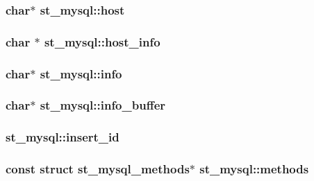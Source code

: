 \subsubsection[{host}]{\setlength{\rightskip}{0pt plus 5cm}char$\ast$ st\+\_\+mysql\+::host}\label{structst__mysql_aa63af77ef72c5732d53d735a67d20714}
\hypertarget{structst__mysql_afcd1b31ab175617ee15a9c26a6258457}{}
\subsubsection[{host\+\_\+info}]{\setlength{\rightskip}{0pt plus 5cm}char $\ast$ st\+\_\+mysql\+::host\+\_\+info}\label{structst__mysql_afcd1b31ab175617ee15a9c26a6258457}
\hypertarget{structst__mysql_acd1bb786ff93e6a27ec5028864945a5a}{}
\subsubsection[{info}]{\setlength{\rightskip}{0pt plus 5cm}char$\ast$ st\+\_\+mysql\+::info}\label{structst__mysql_acd1bb786ff93e6a27ec5028864945a5a}
\hypertarget{structst__mysql_a135e9fa0dea39f54be633acd845634a4}{}
\subsubsection[{info\+\_\+buffer}]{\setlength{\rightskip}{0pt plus 5cm}char$\ast$ st\+\_\+mysql\+::info\+\_\+buffer}\label{structst__mysql_a135e9fa0dea39f54be633acd845634a4}
\hypertarget{structst__mysql_a884df86e03be14c772cfe48511963fc1}{}
\subsubsection[{insert\+\_\+id}]{ st\+\_\+mysql\+::insert\+\_\+id}\label{structst__mysql_a884df86e03be14c772cfe48511963fc1}
\hypertarget{structst__mysql_a04129bc0cbeda076db8ba274ed93328d}{}
\subsubsection[{methods}]{\setlength{\rightskip}{0pt plus 5cm}const struct st\+\_\+mysql\+\_\+methods$\ast$ st\+\_\+mysql\+::methods}\label{structst__mysql_a04129bc0cbeda076db8ba274ed93328d}
\hypertarget{structst__mysql_a4ad66660f7b58712cb4bcaa852d4048c}{}
